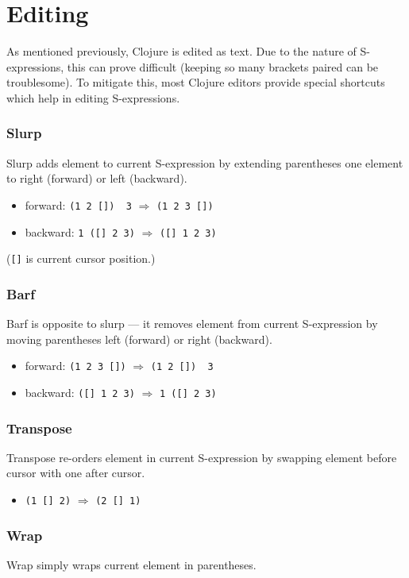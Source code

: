 \documentclass[english,mgr,shortabstract]{iithesis}
\begin{document}
\section{Editing}
\label{sec:editing}
As mentioned previously, Clojure is edited as text.
Due to the nature of S-expressions, this can prove difficult (keeping so many
brackets paired can be troublesome).
To mitigate this, most Clojure editors provide special shortcuts which help in
editing S-expressions.

\subsubsection*{\bfseries Slurp}
Slurp adds element to current S-expression by extending parentheses one element
to right (forward) or left (backward).

\begin{itemize}
\item forward: \lstinline|(1 2 [])  3| $\Rightarrow$ \lstinline|(1 2 3 [])|
\item backward: \lstinline|1 ([] 2 3)| $\Rightarrow$ \lstinline|([] 1 2 3)|
\end{itemize}
(\lstinline{[]} is current cursor position.)

\subsubsection{Barf}
Barf is opposite to slurp --- it removes element from current S-expression by
moving parentheses left (forward) or right (backward).
\begin{itemize}
\item forward: \lstinline|(1 2 3 [])| $\Rightarrow$ \lstinline|(1 2 [])  3|
\item backward: \lstinline|([] 1 2 3)| $\Rightarrow$ \lstinline|1 ([] 2 3)|
\end{itemize}

\subsubsection{Transpose}
Transpose re-orders element in current S-expression by swapping element before
cursor with one after cursor.
\begin{itemize}
\item \lstinline|(1 [] 2)| $\Rightarrow$ \lstinline|(2 [] 1)|
\end{itemize}

\subsubsection{Wrap}
Wrap simply wraps current element in parentheses.
\end{document}
